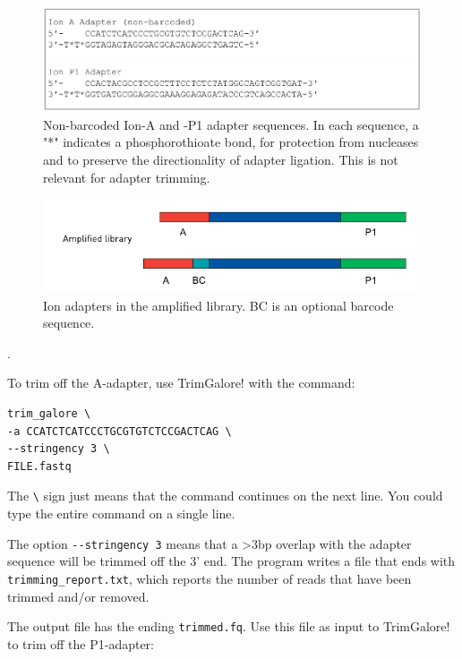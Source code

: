 \documentclass[11pt]{article}
\begin{document}
\begin{figure}[htb]
\centering
\includegraphics[width=14cm]{IonAdapters.png}
\caption{\label{fig:ionadapters}Non-barcoded Ion-A and -P1 adapter sequences. In each sequence, a "*" indicates a phosphorothioate bond, for protection from nucleases and to preserve the directionality of adapter ligation. This is not relevant for adapter trimming.}
\end{figure}

\begin{figure}[htb]
\centering
\includegraphics[width=14cm]{IonLibraryWithAdapters.png}
\caption{\label{fig:adapterorientations}Ion adapters in the amplified library. BC is an optional barcode sequence.}
\end{figure}.

To trim off the A-adapter, use TrimGalore! with the command:

\begin{verbatim}
trim_galore \
-a CCATCTCATCCCTGCGTGTCTCCGACTCAG \
--stringency 3 \
FILE.fastq
\end{verbatim}


The \texttt{\textbackslash{}} sign just means that the command continues on the next
line. You could type the entire command on a single line.


The option \texttt{-{}-stringency 3} means that a >3bp overlap with the adapter
sequence will be trimmed off the 3' end. The program writes a file
that ends with \texttt{trimming\_report.txt}, which reports the number of
reads that have been trimmed and/or removed.

The output file has the ending \texttt{trimmed.fq}. Use this file as
input to TrimGalore! to trim off the P1-adapter:
\end{document}
